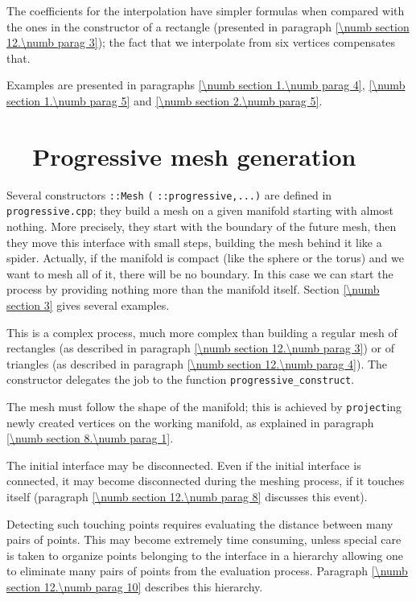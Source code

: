 The coefficients for the interpolation have simpler formulas when compared with the ones in the
constructor of a rectangle (presented in paragraph \ref{\numb section 12.\numb parag 3});
the fact that we interpolate from six vertices compensates that.

Examples are presented in paragraphs \ref{\numb section 1.\numb parag 4},
\ref{\numb section 1.\numb parag 5} and \ref{\numb section 2.\numb parag 5}.


\section{~~Progressive mesh generation}\label{\numb section 12.\numb parag 5}

Several constructors {\small\tt {}::Mesh} {\small\tt(}
{\small\tt{}::progressive,...)} are defined in {\small\tt progressive.cpp};
they build a mesh on a given manifold starting with almost nothing.
More precisely, they start with the boundary of the future mesh, then they
move this interface with small steps, building the mesh behind it like a spider.
Actually, if the manifold is compact (like the sphere or the torus) and we want to mesh
all of it, there will be no boundary.
In this case we can start the process by providing nothing more than the manifold itself.
Section \ref{\numb section 3} gives several examples.

This is a complex process, much more complex than building a regular mesh of rectangles
(as described in paragraph \ref{\numb section 12.\numb parag 3}) or of triangles (as described
in paragraph \ref{\numb section 12.\numb parag 4}).
The constructor delegates the job to the function {\small\tt progressive\_construct}.

The mesh must follow the shape of the manifold; this is achieved by {\small\tt project}ing
newly created vertices on the working manifold, as explained in paragraph
\ref{\numb section 8.\numb parag 1}.

The initial interface may be disconnected.
Even if the initial interface is connected, it may become disconnected during the meshing
process, if it touches itself (paragraph \ref{\numb section 12.\numb parag 8}
discusses this event).

Detecting such touching points requires evaluating the distance between many pairs of points.
This may become extremely time consuming, unless special care is taken to organize points
belonging to the interface in a hierarchy allowing one to eliminate many pairs of points
from the evaluation process.
Paragraph \ref{\numb section 12.\numb parag 10} describes this hierarchy.

